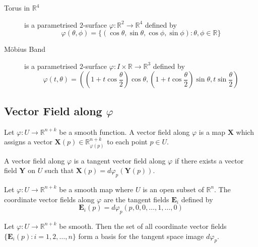 \begin{description}
	\item[Torus in $\mathbb{R}^4$] is a parametrised $2$-surface $\varphi : \mathbb{R}^2 \to \mathbb{R}^4$ defined by
	\begin{equation}
		\varphi(\theta,\phi) = \{ (\cos \theta,\sin \theta,\cos \phi,\sin \phi) : \theta,\phi \in \mathbb{R} \}
	\end{equation}
\item[M\"obius Band] is a parametrised $2$-surface $\varphi : I \times \mathbb{R} \to \mathbb{R}^3$ defined by
	\begin{equation}
		\varphi(t,\theta) = \left( \left(1+t \cos \frac{\theta}{2}\right)\cos \theta, \left( 1+t \cos \frac{\theta}{2}\right) \sin \theta, t \sin\frac{\theta}{2} \right)
	\end{equation}
\end{description}

\subsection{Vector Field along $\varphi$}
\begin{definition}
	Let $\varphi : U \to \mathbb{R}^{n+k}$ be a smooth function.
	A vector field along $\varphi$ is a map $\boldsymbol{X}$ which assigns a vector $\boldsymbol{X}(p) \in \mathbb{R}_{\varphi(p)}^{n+k}$ to each point $p \in U$.
\end{definition}

\begin{definition}
	A vector field along $\varphi$ is a tangent vector field along $\varphi$ if there exists a vector field $\boldsymbol{Y}$ on $U$ such that $\boldsymbol{X}(p) = d\varphi_p(\boldsymbol{Y}(p))$.
\end{definition}

\begin{definition}
	Let $\varphi : U \to \mathbb{R}^{n+k}$ be a smooth map where $U$ is an open subset of $\mathbb{R}^n$.
	The coordinate vector fields along $\varphi$ are the tangent fields $\boldsymbol{E}_i$ defined by
	\begin{equation}
		\boldsymbol{E}_i(p) = d\varphi_p(p,0,0,\dots,1,\dots,0)
	\end{equation}
\end{definition}

\begin{theorem}
	Let $\varphi : U \to \mathbb{R}^{n+k}$ be smooth.
	Then the set of all coordinate vector fields $\{ \boldsymbol{E}_i(p) : i = 1,2,\dots,n \}$ form a basis for the tangent space image $d\varphi_p$.
\end{theorem}

